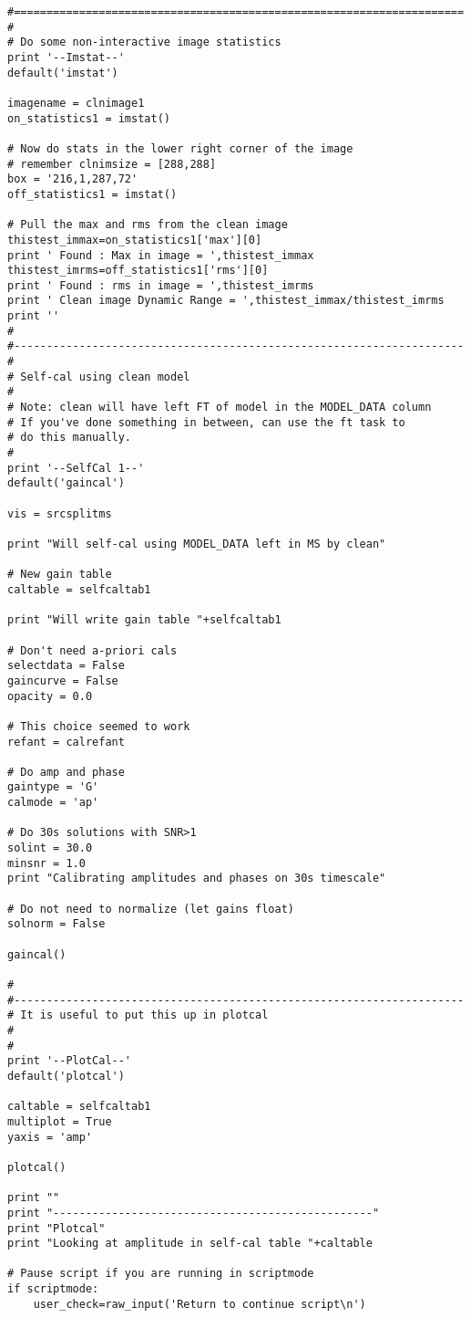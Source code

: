 \begin{verbatim}
#=====================================================================
#
# Do some non-interactive image statistics
print '--Imstat--'
default('imstat')

imagename = clnimage1
on_statistics1 = imstat()

# Now do stats in the lower right corner of the image
# remember clnimsize = [288,288]
box = '216,1,287,72'
off_statistics1 = imstat()

# Pull the max and rms from the clean image
thistest_immax=on_statistics1['max'][0]
print ' Found : Max in image = ',thistest_immax
thistest_imrms=off_statistics1['rms'][0]
print ' Found : rms in image = ',thistest_imrms
print ' Clean image Dynamic Range = ',thistest_immax/thistest_imrms
print ''
#
#---------------------------------------------------------------------
#
# Self-cal using clean model
#
# Note: clean will have left FT of model in the MODEL_DATA column
# If you've done something in between, can use the ft task to
# do this manually.
#
print '--SelfCal 1--'
default('gaincal')

vis = srcsplitms

print "Will self-cal using MODEL_DATA left in MS by clean"

# New gain table
caltable = selfcaltab1

print "Will write gain table "+selfcaltab1

# Don't need a-priori cals
selectdata = False
gaincurve = False
opacity = 0.0

# This choice seemed to work
refant = calrefant

# Do amp and phase
gaintype = 'G'
calmode = 'ap'

# Do 30s solutions with SNR>1
solint = 30.0
minsnr = 1.0
print "Calibrating amplitudes and phases on 30s timescale"

# Do not need to normalize (let gains float)
solnorm = False

gaincal()

#
#---------------------------------------------------------------------
# It is useful to put this up in plotcal
#
#
print '--PlotCal--'
default('plotcal')

caltable = selfcaltab1
multiplot = True
yaxis = 'amp'

plotcal()

print ""
print "-------------------------------------------------"
print "Plotcal"
print "Looking at amplitude in self-cal table "+caltable

# Pause script if you are running in scriptmode
if scriptmode:
    user_check=raw_input('Return to continue script\n')


\end{verbatim}
